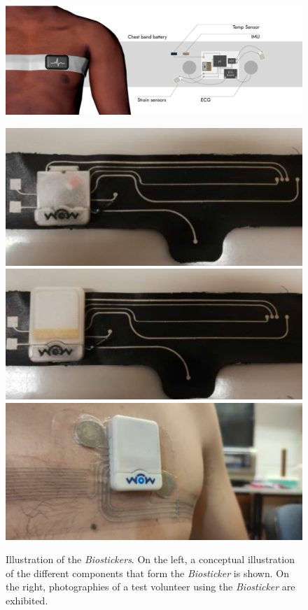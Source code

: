 \begin{figure}[H]
    \begin{minipage}[r]{0.74\linewidth}
        \includegraphics[width=\linewidth]{images/biosticker imgs/test.png}
    \end{minipage}
    \begin{minipage}[l]{0.25\linewidth}
        \includegraphics[width=\linewidth]{images/biosticker imgs/a.png}
        \includegraphics[width=\linewidth]{images/biosticker imgs/b.png}
        \includegraphics[width=\linewidth]{images/biosticker imgs/c.png}
    \end{minipage}
    \centering
    \caption[Illustration of the \textit{Biostickers}.]{Illustration of the \textit{Biostickers}. On the left, a conceptual illustration of the different components that form the \textit{Biosticker} is shown. On the right, photographies of a test volunteer using the \textit{Biosticker} are exhibited.}
    \label{fig:biosticker-imgs}
\end{figure}


